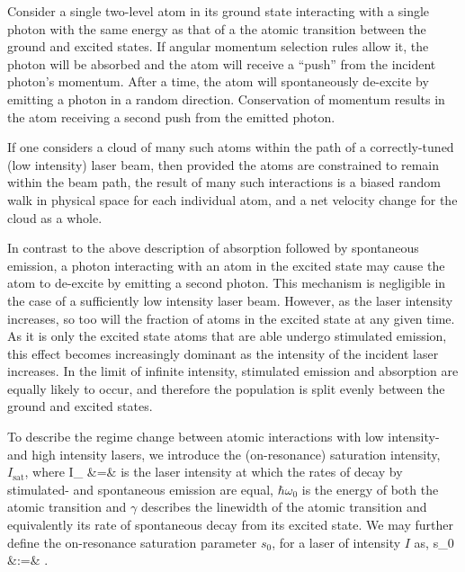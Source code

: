 
Consider a single two-level atom in its ground state interacting with a single photon with the same energy as that of a the atomic transition between the ground and excited states.  If angular momentum selection rules allow it, the photon will be absorbed and the atom will receive a ``push'' 
from the incident 
%
%
photon's momentum.  
After a time, the atom will spontaneously de-excite by emitting a photon in a random direction.  Conservation of momentum results in the atom receiving a second push from the emitted photon.  

If one considers a cloud of many such atoms within the path of a correctly-tuned (low intensity) laser beam, then provided the atoms are constrained to remain within the beam path, the result of many such interactions is a biased random walk in physical space for each individual atom, and a net velocity change for the cloud as a whole.

In contrast to the above description of absorption followed by spontaneous emission, a photon interacting with an atom in the excited state may cause the atom to de-excite by emitting a second photon.  This mechanism is negligible in the case of a sufficiently low intensity laser beam.  However, as the laser intensity increases, so too will the fraction of atoms in the excited state at any given time.  As it is only the excited state atoms that are able undergo stimulated emission, this effect becomes increasingly dominant as the intensity of the incident laser increases.  In the limit of infinite intensity, stimulated emission and absorption are equally likely to occur, and therefore the population is split evenly between the ground and excited states.  

To describe the regime change between atomic interactions with low intensity- and high intensity lasers, we introduce the (on-resonance) saturation intensity, $I_{\mathrm{sat}}$, where 
\bea
I_{} &=& 
\eea
is the laser intensity at which the rates of decay by stimulated- and spontaneous emission are equal, $\hbar \omega_0$ is the energy of both the atomic transition %
and $\gamma$ describes the linewidth of the atomic transition and equivalently its rate of spontaneous decay from its excited state.  We may further define the on-resonance saturation parameter $s_0$, for a laser of intensity $I$ as,
\bea
s_0 &:=& .
\eea

